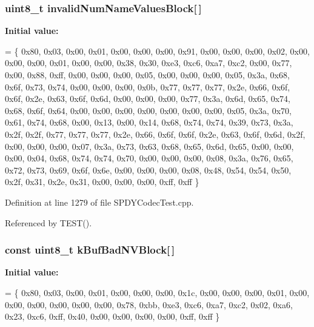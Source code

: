 \subsubsection[{invalid\+Num\+Name\+Values\+Block}]{\setlength{\rightskip}{0pt plus 5cm}uint8\+\_\+t invalid\+Num\+Name\+Values\+Block[$\,$]}\label{SPDYCodecTest_8cpp_a6f8e2f8af8ea89266a9fff3035e1d159}
{\bfseries Initial value\+:}
\begin{DoxyCode}
= \{
  0x80, 0x03, 0x00, 0x01, 0x00, 0x00, 0x00, 0x91,
  0x00, 0x00, 0x00, 0x02, 0x00, 0x00, 0x00, 0x01,
  0x00, 0x00, 0x38, 0x30, 0xe3, 0xc6, 0xa7, 0xc2,
  0x00, 0x77, 0x00, 0x88, 0xff, 0x00, 0x00, 0x00,
  0x05, 0x00, 0x00, 0x00, 0x05, 0x3a, 0x68, 0x6f,
  0x73, 0x74, 0x00, 0x00, 0x00, 0x0b, 0x77, 0x77,
  0x77, 0x2e, 0x66, 0x6f, 0x6f, 0x2e, 0x63, 0x6f,
  0x6d, 0x00, 0x00, 0x00, 0x77, 0x3a, 0x6d, 0x65,
  0x74, 0x68, 0x6f, 0x64, 0x00, 0x00, 0x00, 0x00,
  0x00, 0x00, 0x00, 0x05, 0x3a, 0x70, 0x61, 0x74,
  0x68, 0x00, 0x13, 0x00, 0x14, 0x68, 0x74, 0x74,
  0x39, 0x73, 0x3a, 0x2f, 0x2f, 0x77, 0x77, 0x77,
  0x2e, 0x66, 0x6f, 0x6f, 0x2e, 0x63, 0x6f, 0x6d,
  0x2f, 0x00, 0x00, 0x00, 0x07, 0x3a, 0x73, 0x63,
  0x68, 0x65, 0x6d, 0x65, 0x00, 0x00, 0x00, 0x04,
  0x68, 0x74, 0x74, 0x70, 0x00, 0x00, 0x00, 0x08,
  0x3a, 0x76, 0x65, 0x72, 0x73, 0x69, 0x6f, 0x6e,
  0x00, 0x00, 0x00, 0x08, 0x48, 0x54, 0x54, 0x50,
  0x2f, 0x31, 0x2e, 0x31, 0x00, 0x00, 0x00, 0xff,
  0xff
\}
\end{DoxyCode}


Definition at line 1279 of file S\+P\+D\+Y\+Codec\+Test.\+cpp.



Referenced by T\+E\+S\+T().

\subsubsection[{k\+Buf\+Bad\+N\+V\+Block}]{\setlength{\rightskip}{0pt plus 5cm}const uint8\+\_\+t k\+Buf\+Bad\+N\+V\+Block[$\,$]}\label{SPDYCodecTest_8cpp_ac26dd1d9ebaf6a267addbc4f78578e17}
{\bfseries Initial value\+:}
\begin{DoxyCode}
= \{
 0x80, 0x03, 0x00, 0x01, 0x00, 0x00, 0x00, 0x1c,
 0x00, 0x00, 0x00, 0x01, 0x00, 0x00, 0x00, 0x00,
 0x00, 0x00, 0x78, 0xbb, 0xe3, 0xc6, 0xa7, 0xc2,
 0x02, 0xa6, 0x23, 0xc6, 0xff, 0x40, 0x00, 0x00,
 0x00, 0x00, 0xff, 0xff
\}
\end{DoxyCode}


